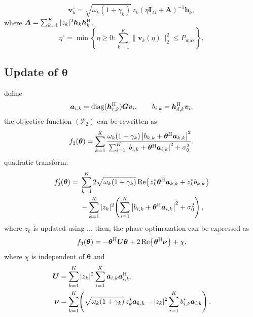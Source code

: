 \begin{equation}
    \bm{v}_k^{\circ} = \sqrt{\omega_k(1+\gamma_k)}\, z_k \left(\eta \bm{I}_M + \bm{A}\right)^{-1} \bm{h}_k,
\end{equation}
where $\bm{A} = \sum_{k=1}^{K} |z_k|^2 \bm{h}_k \bm{h}_k^{{\mathrm{H}}}$.
\begin{equation}
    \eta^{\circ} = \min\!\left\{\eta \ge 0 : \sum_{k=1}^{K} \|\bm{v}_k(\eta)\|_2^2 \le P_{\max}\right\},
\end{equation}

\subsection{Update of $\bm{\theta}$}

define
\begin{equation}
    \bm{a}_{i,k} = \operatorname{diag}(\bm{h}_{r,k}^{{\mathrm{H}}})\bm{G}\bm{v}_i,
    \qquad
    b_{i,k} = \bm{h}_{d,k}^{{\mathrm{H}}}\bm{v}_i,
\end{equation}
the objective function $(\mathcal{P}_2)$ can be rewritten as
\begin{equation}
    f_2(\bm{\theta}) = \sum_{k=1}^{K}
    \frac{\omega_k(1+\gamma_k)\left|b_{k,k} + \bm{\theta}^{{\mathrm{H}}}\bm{a}_{k,k}\right|^2}
    {\sum_{i=1}^{K}\left|b_{i,k} + \bm{\theta}^{{\mathrm{H}}}\bm{a}_{i,k}\right|^2 + \sigma_0^2}.
\end{equation}
quadratic transform:
\begin{align}
    f_2'(\bm{\theta}) = \ & \sum_{k=1}^{K} 2\sqrt{\omega_k(1+\gamma_k)}\, \mathrm{Re}\!\left\{z_k^{*}\bm{\theta}^{{\mathrm{H}}}\bm{a}_{k,k} + z_k^{*} b_{k,k}\right\} \notag \\
    & - \sum_{k=1}^{K} |z_k|^2 \!\left(\sum_{i=1}^{K}\left|b_{i,k} + \bm{\theta}^{{\mathrm{H}}}\bm{a}_{i,k}\right|^2 + \sigma_0^2\right),
\end{align}
where $z_k$ is updated using ... 
then, the phase optimazation can be expressed as
\begin{equation}
    f_3(\bm{\theta}) = -\bm{\theta}^{{\mathrm{H}}}\bm{U}\bm{\theta} + 2\,\mathrm{Re}\!\left\{\bm{\theta}^{{\mathrm{H}}}\bm{\nu}\right\} + \chi,
\end{equation}
where $\chi$  is independent of $\bm{\theta}$ and
\begin{align}
    \bm{U} &= \sum_{k=1}^{K} |z_k|^2 \sum_{i=1}^{K} \bm{a}_{i,k}\bm{a}_{i,k}^{{\mathrm{H}}}, \\
    \bm{\nu} &= \sum_{k=1}^{K} \!\left(\sqrt{\omega_k(1+\gamma_k)}\, z_k^{*}\bm{a}_{k,k} - |z_k|^2 \sum_{i=1}^{K} b_{i,k}^{*}\bm{a}_{i,k}\right).
\end{align}
